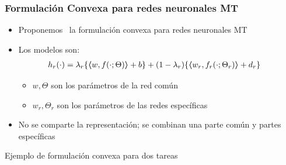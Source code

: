 \documentclass[aspectratio=43,spanish]{beamer}
\newcommand{\dotp}[2]{\bm{\left\langle} #1, #2 \bm{\right\rangle}}
\begin{document}
\begin{frame}
      \frametitle{Formulación Convexa para redes neuronales MT}

      \begin{itemize}
            \item Proponemos~ la formulación convexa para redes neuronales MT
            \item Los modelos son:
            \begin{equation}
                  \nonumber
                  \begin{aligned}
                      h_r(\cdot) &= \lambda_r \lbrace \dotp{w}{f(\cdot; \Theta)} + b \rbrace + (1 - \lambda_r) \lbrace \dotp{w_r}{f_r(\cdot; \Theta_r)} + d_r \rbrace
                  \end{aligned} 
              \end{equation}
              \begin{itemize}
                  \item $w, \Theta$ son los parámetros de la red común
                  \item $w_r, \Theta_r$ son los parámetros de las redes específicas

              \end{itemize}
              \item No se comparte la representación; se combinan una parte común y partes específicas
      \end{itemize}

\end{frame}

\begin{frame}{Ejemplo de formulación convexa para dos tareas}

      

\end{frame}

\end{document}
